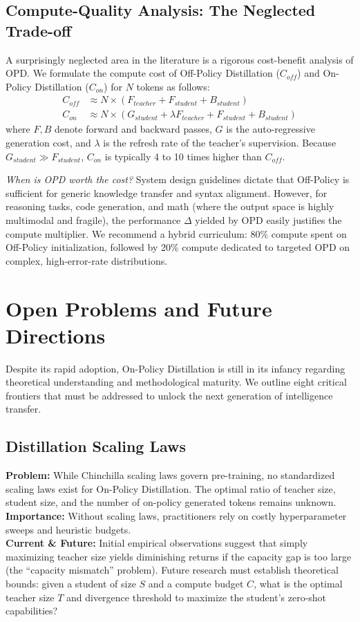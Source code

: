 \documentclass{article}
\begin{document}
\subsection{Compute-Quality Analysis: The Neglected Trade-off}
A surprisingly neglected area in the literature is a rigorous cost-benefit analysis of OPD. We formulate the compute cost of Off-Policy Distillation ($C_{off}$) and On-Policy Distillation ($C_{on}$) for $N$ tokens as follows:
\begin{align}
C_{off} &\approx N \times (F_{teacher} + F_{student} + B_{student}) \\
C_{on} &\approx N \times \left( G_{student} + \lambda F_{teacher} + F_{student} + B_{student} \right)
\end{align}
where $F, B$ denote forward and backward passes, $G$ is the auto-regressive generation cost, and $\lambda$ is the refresh rate of the teacher's supervision. Because $G_{student} \gg F_{student}$, $C_{on}$ is typically 4 to 10 times higher than $C_{off}$. 

\textit{When is OPD worth the cost?} System design guidelines dictate that Off-Policy is sufficient for generic knowledge transfer and syntax alignment. However, for reasoning tasks, code generation, and math (where the output space is highly multimodal and fragile), the performance $\Delta$ yielded by OPD easily justifies the compute multiplier. We recommend a hybrid curriculum: 80\% compute spent on Off-Policy initialization, followed by 20\% compute dedicated to targeted OPD on complex, high-error-rate distributions.

\section{Open Problems and Future Directions}
\label{sec:future}

Despite its rapid adoption, On-Policy Distillation is still in its infancy regarding theoretical understanding and methodological maturity. We outline eight critical frontiers that must be addressed to unlock the next generation of intelligence transfer.

\subsection{Distillation Scaling Laws}
\textbf{Problem:} While Chinchilla scaling laws govern pre-training, no standardized scaling laws exist for On-Policy Distillation. The optimal ratio of teacher size, student size, and the number of on-policy generated tokens remains unknown. \\
\textbf{Importance:} Without scaling laws, practitioners rely on costly hyperparameter sweeps and heuristic budgets. \\
\textbf{Current \& Future:} Initial empirical observations suggest that simply maximizing teacher size yields diminishing returns if the capacity gap is too large (the ``capacity mismatch'' problem). Future research must establish theoretical bounds: given a student of size $S$ and a compute budget $C$, what is the optimal teacher size $T$ and divergence threshold to maximize the student's zero-shot capabilities?
\end{document}
